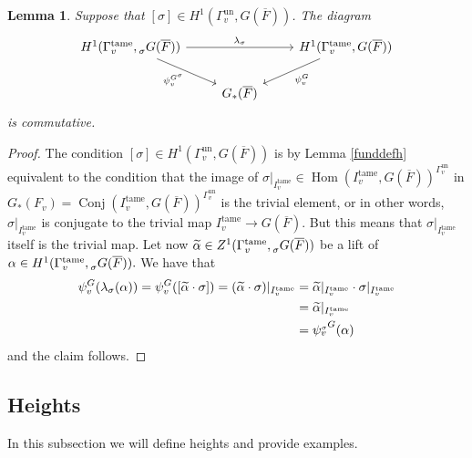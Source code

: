 \documentclass[a4paper,english,12pt]{amsart}
\newcommand{\oF}{\overline F}
\newcommand{\Fv}{F_v}
\newcommand{\sG}{\prescript{}{\sigma}G}
\DeclareMathOperator{\Conj}{Conj}
\DeclareMathOperator{\Hom}{Hom}
\DeclareMathOperator{\un}{un}
\DeclareMathOperator{\tame}{{tame}}
\newtheorem{lem}[equation]{Lemma}
\numberwithin{equation}{subsection}
\begin{document}
\begin{lem}\label{residueandtwist}
Suppose that $[\sigma]\in H^1(\Gamma_v^{\un}, G(\oF))$. The diagram
\[\begin{tikzcd}
	{H^1(\Gamma^{\tame}_v, \sG(\oF))} && {H^1(\Gamma^{\tame}_v, G(\oF))} \\
	& {G_*(\oF)}
	\arrow["{\lambda_{\sigma}}", from=1-1, to=1-3]
	\arrow["{\psi^{G^{\sigma}}_v}"', from=1-1, to=2-2]
	\arrow["{\psi^G_v}", from=1-3, to=2-2]
\end{tikzcd}\]
is commutative.
\end{lem}
\begin{proof}
The condition $[\sigma]\in H^1(\Gamma_v^{\un}, G(\oF))$ is by Lemma \ref{funddefh} equivalent to the condition that the image of $\sigma|_{I_v^{\tame}}\in \Hom(I_v^{\tame}, G(\oF))^{\Gamma_v^{\un}}$ in $G_*(\Fv)=\Conj(I_v^{\tame}, G(\oF))^{\Gamma_v^{\un}}$ is the trivial element, or in other words, $\sigma|_{I_v^{\tame}}$ is conjugate to the trivial map $I_v^{\tame}\to G(\oF)$. But this means that $\sigma|_{I_v^{\tame}}$ itself is the trivial map. Let now $\widetilde\alpha\in Z^1(\Gamma_v^{\tame}, \sG(\oF))$ be a lift of $\alpha\in H^1(\Gamma_v^{\tame}, \sG(\oF)).$ We have that \begin{align*}\psi_v^G(\lambda_{\sigma}(\alpha))=\psi_v^G([\widetilde\alpha\cdot\sigma])=(\widetilde\alpha\cdot\sigma)|_{I_v^{\tame}}&=\widetilde\alpha|_{I_v^{\tame}}\cdot\sigma|_{I_v^{\tame}}\\&=\widetilde\alpha|_{I_v^{\tame}}\\&=\psi^{\sG}_v(\alpha)
\end{align*}and the claim follows. 
\end{proof}
\subsection{Heights}\label{secdefheight} In this subsection we will define heights and provide examples.
\end{document}
